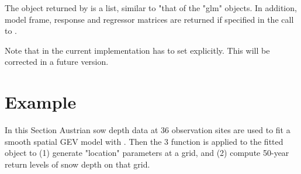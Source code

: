 \documentclass[a4paper,nojss]{jss}
\begin{document}
The object returned by  is a list, similar to "that of the "glm" objects. In addition, model frame, response and regressor matrices are returned if specified in the call to .

Note that in the current implementation  has to set explicitly. This will be corrected in a future version.


\section{Example}
\label{sec:example}

In this Section Austrian sow depth data at 36 observation sites are used to fit a smooth spatial GEV model with . Then the 3 function  is applied to the fitted object to (1) generate "location" parameters at a grid, and (2) compute 50-year return levels of snow depth on that grid. 
\end{document}
